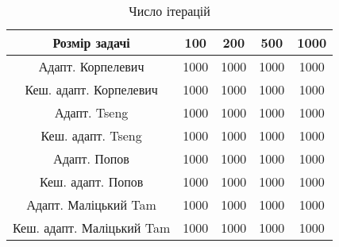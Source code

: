 \begin{table}[H]
	\centering
	\begin{tabular}{|c||c|c|c|c|}\hline
		Розмір задачі & 100 & 200 & 500 & 1000 \\ \hline \hline
		Адапт. Корпелевич & 1000 & 1000 & 1000 & 1000 \\ \hline
		Кеш. адапт. Корпелевич & 1000 & 1000 & 1000 & 1000 \\ \hline
		Адапт. Tseng & 1000 & 1000 & 1000 & 1000 \\ \hline
		Кеш. адапт. Tseng & 1000 & 1000 & 1000 & 1000 \\ \hline
		Адапт. Попов & 1000 & 1000 & 1000 & 1000 \\ \hline
		Кеш. адапт. Попов & 1000 & 1000 & 1000 & 1000 \\ \hline
		Адапт. Маліцький Tam & 1000 & 1000 & 1000 & 1000 \\ \hline
		Кеш. адапт. Маліцький Tam & 1000 & 1000 & 1000 & 1000 \\ \hline
	\end{tabular}
	\caption{Число ітерацій}
\end{table}
